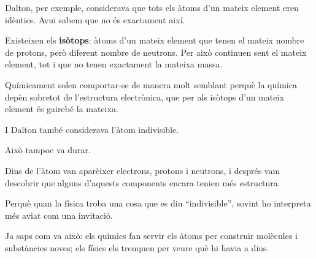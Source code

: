 Dalton, per exemple, considerava que tots els àtoms d'un mateix element eren idèntics. Avui sabem que no és exactament així.

Existeixen els \textbf{isòtops}: àtoms d'un mateix element que tenen el mateix nombre de protons, però diferent nombre de neutrons. Per això continuen sent el mateix element, tot i que no tenen exactament la mateixa massa.

Químicament solen comportar-se de manera molt semblant perquè la química depèn sobretot de l'estructura electrònica, que per als isòtops d'un mateix element és gairebé la mateixa.

I Dalton també considerava l'àtom indivisible.

Això tampoc va durar.

Dins de l'àtom van aparèixer electrons, protons i neutrons, i després vam descobrir que alguns d'aquests components encara tenien més estructura.

Perquè quan la física troba una cosa que es diu ``indivisible'', sovint ho interpreta més aviat com una invitació.

Ja saps com va això: els químics fan servir els àtoms per construir molècules i substàncies noves; els físics els trenquen per veure què hi havia a dins.
